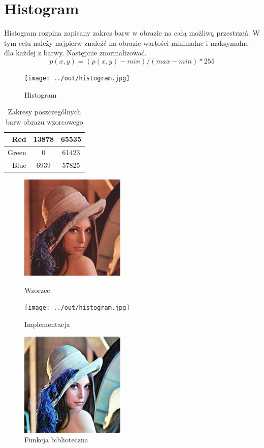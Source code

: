 \documentclass[a4paper,12pt]{article}
\begin{document}
\newpage
\section{Histogram}
Histogram rozpina zapisany zakres barw w obrazie na całą możliwą przestrzeń. W tym celu należy najpierw znaleźć na obrazie wartości minimalne i maksymalne dla każdej z barwy. Następnie znormalizować.
$$p(x, y) = (p(x, y) - min) / (max - min) * 255$$
\begin{figure}[h!]
   \centering
   \texttt{[image: ../out/histogram.jpg]}
   \caption{Histogram}
\end{figure}

\begin{table}[h!]
\centering
\begin{tabular}{|r|c|c|}
  \hline 
  Red & 13878 & 65535\\
  \hline
  Green & 0 & 61423 \\
  \hline
  Blue & 6939 & 57825 \\
  \hline
\end{tabular} 
\caption{Zakresy poszczególnych barw obrazu wzorcowego}
\end{table}


\newpage

\begin{figure}
\begin{minipage}[t]{5cm}
\begin{center}
\includegraphics[width=5cm,clip]{../../lena.jpg}
\caption{Wzorzec}
\end{center}
\end{minipage}
\hfill
\begin{minipage}[t]{5cm}
\begin{center}
\texttt{[image: ../out/histogram.jpg]}
\caption{Implementacja}
\end{center}
\end{minipage}
\hfill
\begin{minipage}[t]{5cm}
\begin{center}
\includegraphics[width=5cm,clip]{grafika/histogram_magick.jpg}
\caption{Funkcja biblioteczna}
\end{center}
\end{minipage}
\end{figure} 
\end{document}
